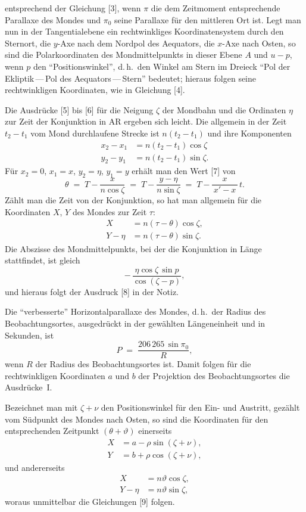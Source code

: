 \documentclass[10pt,a4paper]{article}
\begin{document}
\noindent entsprechend der Gleichung [3], wenn $\pi$ die dem Zeitmoment
entsprechende Parallaxe des Mondes und $\pi_{0}$ seine Parallaxe f\"ur
den mittleren Ort ist. Legt man nun in der Tangentialebene ein
rechtwinkliges Koordinatensystem durch den Sternort, die $y$-Axe nach
dem Nordpol des Aequators, die $x$-Axe nach Osten, so sind die
Polarkoordinaten des Mondmittelpunkts in dieser Ebene $A$ und $u-p$,
wenn $p$ den \enquote{Positionswinkel}, d.\,h.\ den Winkel am Stern im
Dreieck \enquote{Pol der Ekliptik\,---\,Pol des Aequators\,---\,Stern}
bedeutet; hieraus folgen seine rechtwinkligen Koordinaten, wie in
Gleichung [4].

Die Ausdr\"ucke [5] bis [6] f\"ur die Neigung $\zeta$ der Mondbahn und
die Ordinaten $\eta$ zur Zeit der Konjunktion in AR ergeben sich
leicht. Die allgemein in der Zeit $t_{2}-t_{1}$ vom Mond
durchlaufene Strecke ist $n(t_{2}-t_{1})$ und ihre Komponenten
\[
\begin{aligned}
x_{2}-x_{1} &= n(t_{2}-t_{1})\cos\zeta\\
y_{2}-y_{1} &= n(t_{2}-t_{1})\sin\zeta.
\end{aligned}
\]
F\"ur $x_{2}=0$, $x_{1}=x$, $y_{2}=\eta$, $y_{1}=y$ erh\"alt man den
Wert [7] von
\[
\theta \;=\; T - \frac{x}{n\cos\zeta}
            \;=\; T - \frac{y-\eta}{n\sin\zeta}
            \;=\; T - \frac{x}{\,x'-x\,}\,t.
\]
Z\"ahlt man die Zeit von der Konjunktion, so hat man allgemein f\"ur
die Koordinaten $X$, $Y$ des Mondes zur Zeit $\tau$:
\[
\begin{aligned}
X &= n(\tau-\theta)\cos\zeta,\\
Y-\eta &= n(\tau-\theta)\sin\zeta.
\end{aligned}
\]
Die Abszisse des Mondmittelpunkts, bei der die Konjunktion in
L\"ange stattfindet, ist gleich
\[
-\,\frac{\eta\cos\zeta\,\sin p}{\cos(\zeta-p)},
\]
und hieraus folgt der Ausdruck [8] in der Notiz.

\smallskip
Die \enquote{verbesserte} Horizontalparallaxe des Mondes, d.\,h.\ der
Radius des Beobachtungsortes, ausgedr\"uckt in der gew\"ahlten
L\"angeneinheit und in Sekunden, ist
\[
P \;=\; \frac{206\,265\,\sin\pi_{0}}{R},
\]
wenn $R$ der Radius des Beobachtungsortes ist. Damit folgen f\"ur die
rechtwinkligen Koordinaten $a$ und $b$ der Projektion des
Beobachtungsortes die Ausdr\"ucke~I.

\smallskip
Bezeichnet man mit $\zeta+\nu$ den Positionswinkel f\"ur den Ein- und
Austritt, gez\"ahlt vom S\"udpunkt des Mondes nach Osten, so sind die
Koordinaten f\"ur den entsprechenden Zeitpunkt $(\theta+\vartheta)$
einerseits
\[
\begin{aligned}
X &= a - \rho\sin(\zeta+\nu),\\
Y &= b + \rho\cos(\zeta+\nu),
\end{aligned}
\]
und andererseits
\[
\begin{aligned}
X &= n\vartheta\cos\zeta,\\
Y-\eta &= n\vartheta\sin\zeta,
\end{aligned}
\]
woraus unmittelbar die Gleichungen [9] folgen.
\end{document}
